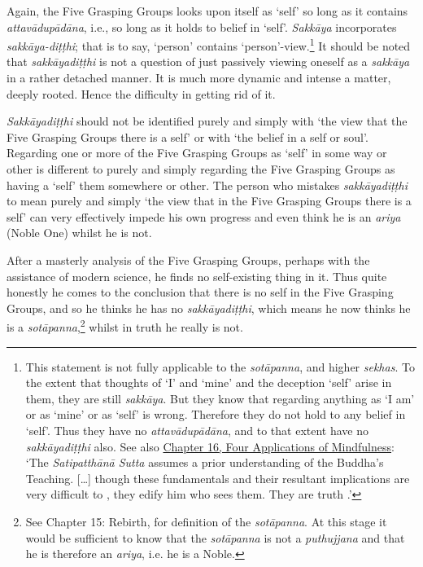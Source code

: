 Again, the Five Grasping Groups looks upon itself as `self' so long as it contains \emph{attavādupādāna}, i.e., so long as it holds to belief in `self'. \emph{Sakkāya} incorporates \emph{sakkāya-diṭṭhi}; that is to say, `person'
\clearpage
contains `person'-view.\footnote{This statement is not fully applicable to the \emph{sotāpanna}, and higher \emph{sekhas}. To the extent that thoughts of `I' and `mine' and the deception `self' arise in them, they are still \emph{sakkāya}. But they know that regarding anything as `I am' or as `mine' or as `self' is wrong. Therefore they do not hold to any belief in `self'. Thus they have no \emph{attavādupādāna}, and to that extent have no \emph{sakkāyadiṭṭhi} also. See also \href{ch-16-satipatthana.xml\#truth-for-him}{Chapter 16, Four Applications of Mindfulness}: `The \emph{Satipatthānā Sutta} assumes a prior understanding of the Buddha's Teaching. [\ldots{}] though these fundamentals and their resultant implications are very difficult to , they edify him who sees them. They are truth .'} It should be noted that \emph{sakkāyadiṭṭhi} is not a question of just passively viewing oneself as a \emph{sakkāya} in a rather detached manner. It is much more dynamic and intense a matter, deeply rooted. Hence the difficulty in getting rid of it.

\emph{Sakkāyadiṭṭhi} should not be identified purely and simply with `the view that  the Five Grasping Groups there is a self' or with `the belief in a self or soul'. Regarding one or more of the Five Grasping Groups as `self' in some way or other is different to purely and simply regarding the Five Grasping Groups as having a `self'  them somewhere or other. The person who mistakes \emph{sakkāyadiṭṭhi} to mean purely and simply `the view that in the Five Grasping Groups there is a self' can very effectively impede his own progress and even think he is an \emph{ariya} (Noble One) whilst he is not.

After a masterly analysis of the Five Grasping Groups, perhaps with the assistance of modern science, he finds no self-existing thing in it. Thus quite honestly he comes to the conclusion that there is no self in the Five Grasping Groups, and so he thinks he has no \emph{sakkāyadiṭṭhi}, which means he now thinks he is a \emph{sotāpanna},\footnote{See Chapter 15: Rebirth, for definition of the \emph{sotāpanna}. At this stage it would be sufficient to know that the \emph{sotāpanna} is not a \emph{puthujjana} and that he is therefore an \emph{ariya}, i.e. he is a Noble.} whilst in truth he really is not.

